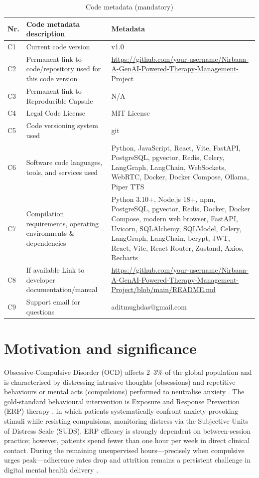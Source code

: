 \documentclass[preprint,12pt,a4paper]{elsarticle}
\begin{document}
\begin{table}[!h]
\centering
\small
\begin{tabular}{|l|p{6.5cm}|p{6.5cm}|}
\hline
\textbf{Nr.} & \textbf{Code metadata description} & \textbf{Metadata} \\
\hline
C1 & Current code version & v1.0 \\
\hline
C2 & Permanent link to code/repository used for this code version & \url{https://github.com/your-username/Nirbaan-A-GenAI-Powered-Therapy-Management-Project} \\
\hline
C3 & Permanent link to Reproducible Capsule & N/A \\
\hline
C4 & Legal Code License & MIT License \\
\hline
C5 & Code versioning system used & git \\
\hline
C6 & Software code languages, tools, and services used 
& Python, JavaScript, React, Vite, FastAPI, PostgreSQL, pgvector, Redis, Celery, LangGraph, LangChain, WebSockets, WebRTC, Docker, Docker Compose, Ollama, Piper TTS \\
\hline
C7 & Compilation requirements, operating environments \& dependencies 
& Python 3.10+, Node.js 18+, npm, PostgreSQL, pgvector, Redis, Docker, Docker Compose, modern web browser, FastAPI, Uvicorn, SQLAlchemy, SQLModel, Celery, LangGraph, LangChain, bcrypt, JWT, React, Vite, React Router, Zustand, Axios, Recharts \\
\hline
C8 & If available Link to developer documentation/manual & \url{https://github.com/your-username/Nirbaan-A-GenAI-Powered-Therapy-Management-Project/blob/main/README.md} \\
\hline
C9 & Support email for questions & aditmughdas@gmail.com \\
\hline
\end{tabular}
\caption{Code metadata (mandatory)}
\label{codeMetadata}
\end{table}

\section{Motivation and significance}

Obsessive-Compulsive Disorder (OCD) affects 2--3\% of the global population and is characterised by distressing intrusive thoughts (obsessions) and repetitive behaviours or mental acts (compulsions) performed to neutralise anxiety \cite{ruscio2010}. The gold-standard behavioural intervention is Exposure and Response Prevention (ERP) therapy \cite{foa2012}, in which patients systematically confront anxiety-provoking stimuli while resisting compulsions, monitoring distress via the Subjective Units of Distress Scale (SUDS). ERP efficacy is strongly dependent on between-session practice; however, patients spend fewer than one hour per week in direct clinical contact. During the remaining unsupervised hours---precisely when compulsive urges peak---adherence rates drop and attrition remains a persistent challenge in digital mental health delivery \cite{simpson2011, linardon2020}.
\end{document}
